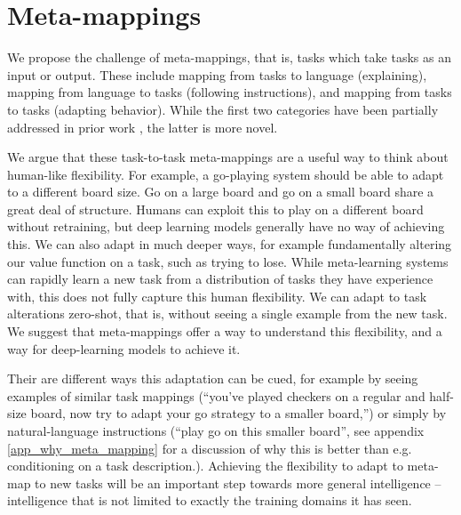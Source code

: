 \documentclass{article}
\begin{document}
\section{Meta-mappings}
We propose the challenge of meta-mappings, that is, tasks which take tasks as an input or output. These include mapping from tasks to language (explaining), mapping from language to tasks (following instructions), and mapping from tasks to tasks (adapting behavior). While the first two categories have been partially addressed in prior work \citep[e.g.][]{Hermann2017, Co-Reyes2019}, the latter is more novel. \par
We argue that these task-to-task meta-mappings are a useful way to think about human-like flexibility. For example, a go-playing system should be able to adapt to a different board size. Go on a large board and go on a small board share a great deal of structure. Humans can exploit this to play on a different board without retraining, but deep learning models generally have no way of achieving this. We can also adapt in much deeper ways, for example fundamentally altering our value function on a task, such as trying to lose. While meta-learning systems can rapidly learn a new task from a distribution of tasks they have experience with, this does not fully capture this human flexibility. We can adapt to task alterations zero-shot, that is, without seeing a single example from the new task. We suggest that meta-mappings offer a way to understand this flexibility, and a way for deep-learning models to achieve it.\par
Their are different ways this adaptation can be cued, for example by seeing examples of similar task mappings (``you've played checkers on a regular and half-size board, now try to adapt your go strategy to a smaller board,'') or simply by natural-language instructions (``play go on this smaller board'', see appendix \ref{app_why_meta_mapping} for a discussion of why this is better than e.g. conditioning on a task description.). Achieving the flexibility to adapt to meta-map to new tasks will be an important step towards more general intelligence -- intelligence that is not limited to exactly the training domains it has seen. \par 
\end{document}
